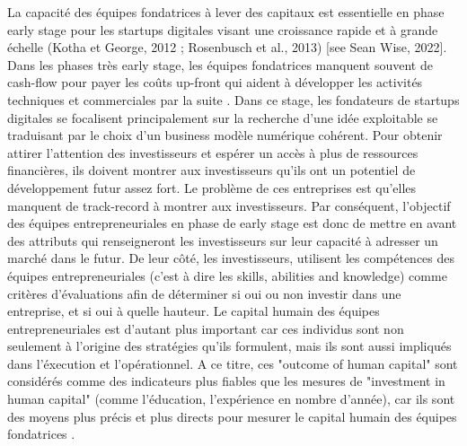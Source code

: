 \documentclass[12pt]{article}
\begin{document}
La capacité des équipes fondatrices à lever des capitaux est essentielle en phase early stage pour les startups digitales visant une croissance rapide et à grande échelle (Kotha et George, 2012 ; Rosenbusch et al., 2013) [see Sean Wise, 2022]. Dans les phases très early stage, les équipes fondatrices manquent souvent de cash-flow pour payer les coûts up-front qui aident à développer les activités techniques et commerciales par la suite \citep{ratzinger2018impact}. Dans ce stage, les fondateurs de startups digitales se focalisent principalement sur la recherche d'une idée exploitable se traduisant par le choix d'un business modèle numérique cohérent. Pour obtenir attirer l'attention des investisseurs et espérer un accès à plus de ressources financières, ils doivent montrer aux investisseurs qu'ils ont un potentiel de développement futur assez fort. Le problème de ces entreprises est qu'elles manquent de track-record à montrer aux investisseurs. Par conséquent, l'objectif des équipes entrepreneuriales en phase de early stage est donc de mettre en avant des attributs qui renseigneront les investisseurs sur leur capacité à adresser un marché dans le futur. De leur côté, les investisseurs, utilisent les compétences des équipes entrepreneuriales (c'est à dire les skills, abilities and knowledge) comme critères d'évaluations afin de déterminer si oui ou non investir dans une entreprise, et si oui à quelle hauteur. Le capital humain des équipes entrepreneuriales est d'autant plus important car ces individus sont non seulement à l'origine des stratégies qu'ils formulent, mais ils sont aussi impliqués dans l'éxecution et l'opérationnel. A ce titre, ces "outcome of human capital" sont considérés comme des indicateurs plus fiables que les mesures de "investment in human capital" (comme l'éducation, l'expérience en nombre d'année), car ils sont des moyens plus précis et plus directs pour mesurer le capital humain des équipes fondatrices \citep{unger2011human}.
\end{document}
